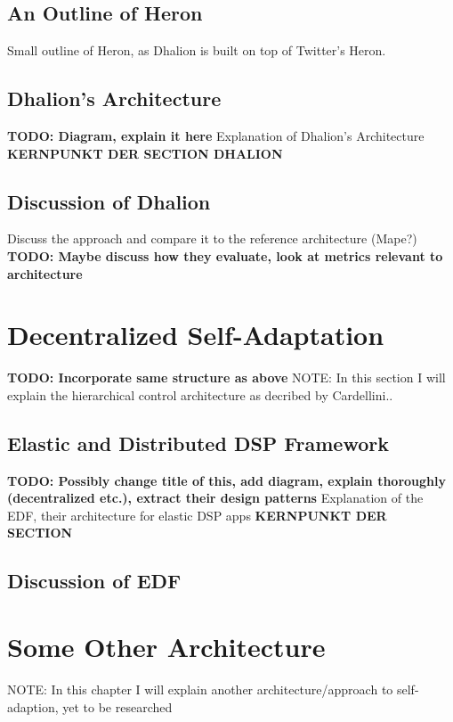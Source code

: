         \subsection{An Outline of Heron}
        \label{sub:heron-outline}
        Small outline of Heron, as Dhalion is built on top of Twitter's Heron.

        \subsection{Dhalion's Architecture}
        \label{sec:dhalion-architecture}
        \textbf{TODO: Diagram, explain it here}
        Explanation of Dhalion's Architecture \textbf{KERNPUNKT DER SECTION DHALION}

        \subsection{Discussion of Dhalion}
        \label{sec:dhalion-discussion}
        Discuss the approach and compare it to the reference architecture (Mape?)
        \textbf{TODO: Maybe discuss how they evaluate, look at metrics relevant to architecture}

    \section{Decentralized Self-Adaptation}
    \label{sec:hierarchical}
    \textbf{TODO: Incorporate same structure as above}
    NOTE: In this section I will explain the hierarchical control architecture as decribed by Cardellini..

        \subsection{Elastic and Distributed DSP Framework}
        \label{sec:edf}
        \textbf{TODO: Possibly change title of this, add diagram, explain thoroughly (decentralized etc.), extract their design patterns}
        Explanation of the EDF, their architecture for elastic DSP apps \textbf{KERNPUNKT DER SECTION}

        \subsection{Discussion of EDF}
        \label{sec:discussion-edf}

    \section{Some Other Architecture}
    \label{sec:soa}
    NOTE: In this chapter I will explain another architecture/approach to self-adaption, yet to be researched


